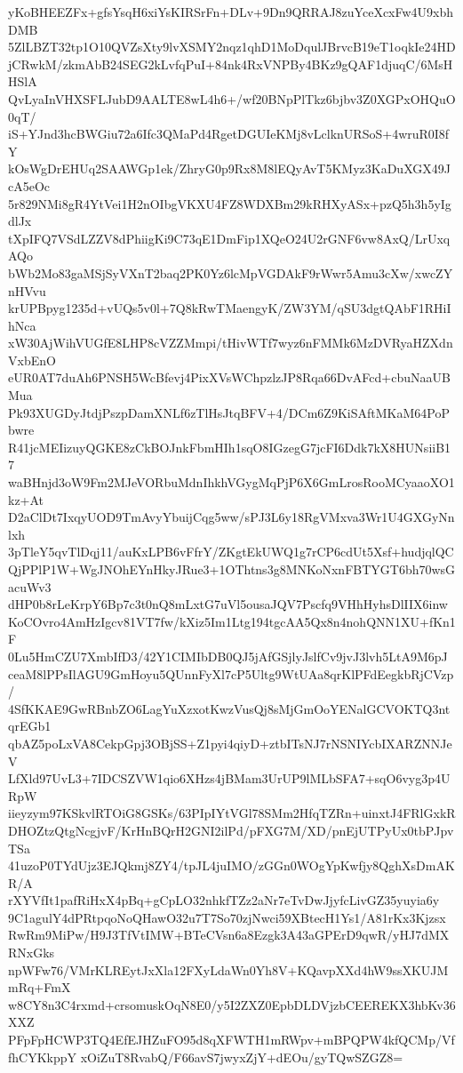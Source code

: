 yKoBHEEZFx+gfsYsqH6xiYsKIRSrFn+DLv+9Dn9QRRAJ8zuYceXcxFw4U9xbhDMB
5ZlLBZT32tp1O10QVZsXty9lvXSMY2nqz1qhD1MoDqulJBrvcB19eT1oqkIe24HD
jCRwkM/zkmAbB24SEG2kLvfqPuI+84nk4RxVNPBy4BKz9gQAF1djuqC/6MsHHSlA
QvLyaInVHXSFLJubD9AALTE8wL4h6+/wf20BNpPlTkz6bjbv3Z0XGPxOHQuO0qT/
iS+YJnd3hcBWGiu72a6Ifc3QMaPd4RgetDGUIeKMj8vLclknURSoS+4wruR0I8fY
kOsWgDrEHUq2SAAWGp1ek/ZhryG0p9Rx8M8lEQyAvT5KMyz3KaDuXGX49JcA5eOc
5r829NMi8gR4YtVei1H2nOIbgVKXU4FZ8WDXBm29kRHXyASx+pzQ5h3h5yIgdlJx
tXpIFQ7VSdLZZV8dPhiigKi9C73qE1DmFip1XQeO24U2rGNF6vw8AxQ/LrUxqAQo
bWb2Mo83gaMSjSyVXnT2baq2PK0Yz6lcMpVGDAkF9rWwr5Amu3cXw/xwcZYnHVvu
krUPBpyg1235d+vUQs5v0l+7Q8kRwTMaengyK/ZW3YM/qSU3dgtQAbF1RHiIhNca
xW30AjWihVUGfE8LHP8cVZZMmpi/tHivWTf7wyz6nFMMk6MzDVRyaHZXdnVxbEnO
eUR0AT7duAh6PNSH5WcBfevj4PixXVsWChpzlzJP8Rqa66DvAFcd+cbuNaaUBMua
Pk93XUGDyJtdjPszpDamXNLf6zTlHsJtqBFV+4/DCm6Z9KiSAftMKaM64PoPbwre
R41jcMEIizuyQGKE8zCkBOJnkFbmHIh1sqO8IGzegG7jcFI6Ddk7kX8HUNsiiB17
waBHnjd3oW9Fm2MJeVORbuMdnIhkhVGygMqPjP6X6GmLrosRooMCyaaoXO1kz+At
D2aClDt7IxqyUOD9TmAvyYbuijCqg5ww/sPJ3L6y18RgVMxva3Wr1U4GXGyNnlxh
3pTleY5qvTlDqj11/auKxLPB6vFfrY/ZKgtEkUWQ1g7rCP6cdUt5Xsf+hudjqlQC
QjPPlP1W+WgJNOhEYnHkyJRue3+1OThtns3g8MNKoNxnFBTYGT6bh70wsGacuWv3
dHP0b8rLeKrpY6Bp7c3t0nQ8mLxtG7uVl5ousaJQV7Pscfq9VHhHyhsDlIIX6inw
KoCOvro4AmHzIgcv81VT7fw/kXiz5Im1Ltg194tgcAA5Qx8n4nohQNN1XU+fKn1F
0Lu5HmCZU7XmbIfD3/42Y1CIMIbDB0QJ5jAfGSjlyJslfCv9jvJ3lvh5LtA9M6pJ
ceaM8lPPsIlAGU9GmHoyu5QUnnFyXl7cP5Ultg9WtUAa8qrKlPFdEegkbRjCVzp/
4SfKKAE9GwRBnbZO6LagYuXzxotKwzVusQj8sMjGmOoYENalGCVOKTQ3ntqrEGb1
qbAZ5poLxVA8CekpGpj3OBjSS+Z1pyi4qiyD+ztbITsNJ7rNSNIYcbIXARZNNJeV
LfXld97UvL3+7IDCSZVW1qio6XHzs4jBMam3UrUP9lMLbSFA7+sqO6vyg3p4URpW
iieyzym97KSkvlRTOiG8GSKs/63PIpIYtVGl78SMm2HfqTZRn+uinxtJ4FRlGxkR
DHOZtzQtgNcgjvF/KrHnBQrH2GNI2ilPd/pFXG7M/XD/pnEjUTPyUx0tbPJpvTSa
41uzoP0TYdUjz3EJQkmj8ZY4/tpJL4juIMO/zGGn0WOgYpKwfjy8QghXsDmAKR/A
rXYVfIt1pafRiHxX4pBq+gCpLO32nhkfTZz2aNr7eTvDwJjyfcLivGZ35yuyia6y
9C1agulY4dPRtpqoNoQHawO32u7T7So70zjNwci59XBtecH1Ys1/A81rKx3Kjzsx
RwRm9MiPw/H9J3TfVtIMW+BTeCVsn6a8Ezgk3A43aGPErD9qwR/yHJ7dMXRNxGks
npWFw76/VMrKLREytJxXla12FXyLdaWn0Yh8V+KQavpXXd4hW9ssXKUJMmRq+FmX
w8CY8n3C4rxmd+crsomuskOqN8E0/y5I2ZXZ0EpbDLDVjzbCEEREKX3hbKv36XXZ
PFpFpHCWP3TQ4EfEJHZuFO95d8qXFWTH1mRWpv+mBPQPW4kfQCMp/VffhCYKkppY
xOiZuT8RvabQ/F66avS7jwyxZjY+dEOu/gyTQwSZGZ8=

